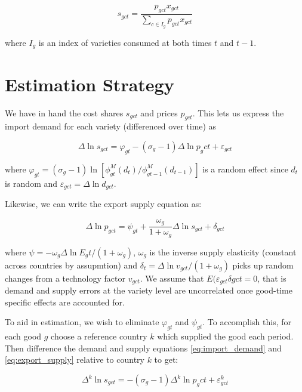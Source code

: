 \documentclass[12pt,a4paper,hidelinks]{article}            %
\begin{document}
\begin{equation}
    s_{gct} = \frac{p_{gct}x_{gct}}{\sum_{c \in I_g}p_{gct}x_{gct}}
\end{equation}

where $I_g$ is an index of varieties consumed at both times $t$ and $t - 1$.

\section{Estimation Strategy}
\label{sec:econometric_methodology}

We have in hand the cost shares $s_{gct}$ and prices $p_{gct}$. This lets us express the import demand for each variety (differenced over time) as

\begin{equation}\label{eq:import_demand}
    \Delta \ln{s_{gct}} = \varphi_{gt} - (\sigma_g - 1) \Delta \ln{p_gct} + \varepsilon_{gct}
\end{equation}

where $\varphi_{gt} = (\sigma_g - 1) \ln{[\phi_{gt}^M (d_t) / \phi_{gt - 1}^M (d_{t - 1})]}$ is a random effect since $d_t$ is random and $\varepsilon_{gct} = \Delta \ln{d_{gct}}$.

Likewise, we can write the export supply equation as:

\begin{equation}\label{eq:export_supply}
    \Delta \ln{p_{gct}} = \psi_{gt} + \frac{\omega_g}{1 + \omega_g} \Delta \ln{s_{gct} + \delta_{gct}}
\end{equation}

where $\psi = -\omega_g \Delta \ln{E_gt / (1 + \omega_g)}$, $\omega_g$ is the inverse supply elasticity (constant across countries by assupmtion) and $\delta_t =  \Delta \ln{v_{gct} / (1 + \omega_g)}$ picks up random changes from a technology factor $v_{gct}$.  We assume that $E(\varepsilon_{gct}\delta{gct} = 0$, that is demand and supply errors at the variety level are uncorrelated once good-time specific effects are accounted for.

To aid in estimation, we wish to eliminate $\varphi_{gt}$ and $\psi_{gt}$.  To accomplish this, for each good $g$ choose a reference country $k$ which supplied the good each period.  Then difference the demand and supply equations \ref{eq:import_demand} and \ref{eq:export_supply} relative to country $k$ to get:

\begin{equation}\label{eq:diffed_import_demand}
    \Delta^k \ln{s_{gct}} = - (\sigma_g - 1) \Delta^k \ln{p_gct} + \varepsilon^k_{gct}
\end{equation}
\end{document}
